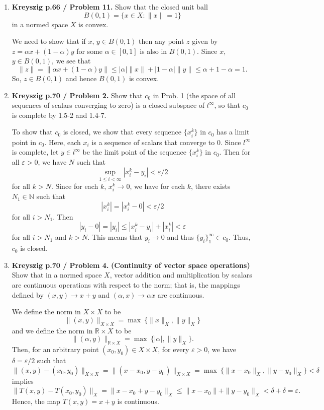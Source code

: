 \documentclass[12pt]{article}
\newcommand{\rl}{\mathbb{R}}
\begin{document}
\begin{enumerate}
\item \textbf{Kreyszig p.66 / Problem 11.}
    Show that the closed unit ball
    $$B(0,1)=\{ x\in X :\|x\|=1\}$$
    in a normed space $X$ is convex.
\begin{mybox}

    We need to show that if $x$, $y\in B(0,1)$
    then any point $z$ given by $z=\alpha x+(1-\alpha)y$
    for some $\alpha\in [0,1]$ is also
    in $B(0,1)$. Since $x$, $y\in B(0,1)$,
    we see that
    $$\|z\|=\|\alpha x+(1-\alpha)y\|\leq
    |\alpha|\|x\|+|1-\alpha|\|y\|\leq \alpha+1-\alpha=1.$$
    So, $z\in B(0,1)$ and hence $B(0,1)$ is convex.
\end{mybox}
 
\item \textbf{Kreyszig p.70 / Problem 2.}
    Show that $c_0$ in Prob. 1 (the space of all sequences
    of scalars converging to zero) is a closed
    subspace of $l^{\infty}$, so that $c_0$ is
    complete by 1.5-2 and 1.4-7.
\begin{mybox}

    To show that $c_0$ is closed, we show that
    every sequence $\{x_i^k\}$ in $c_0$ has a
    limit point in $c_0$. Here, each $x_i$ is a
    sequence of scalars that converge to 0. Since
    $l^\infty$ is complete, let $y\in l^\infty$ be
    the limit point of the sequence
    $\{x_i^k\}$ in $c_0$. Then for all $\varepsilon>0$,
    we have $N$ such that
    $$\sup_{1\leq i<\infty} |x_i^k-y_i|<\varepsilon/2$$
    for all $k>N$. Since for each $k$, $x_i^k\to 0$,
    we have for each $k$, there exists $N_1\in \mathbb{N}$
    such that 
    $$|x_i^k|=|x_i^k-0|<\varepsilon/2$$
    for all $i>N_1$. Then
    $$|y_i-0|=|y_i|\leq|x_i^k-y_i|+|x_i^k|<\varepsilon$$
    for all $i>N_1$ and $k>N$. This means that $y_i\to 0$
    and thus $\{y_i\}_1^\infty\in c_0$. Thus, $c_0$ is
    closed.
\end{mybox}
 
\item \textbf{Kreyszig p.70 / Problem 4.}
    \textbf{(Continuity of vector space operations)}
    Show that in a normed space $X$, vector addition and
    multiplication by scalars are continuous operations with
    respect to the norm; that is, the mappings defined by
    $(x,y) \to x+y$ and $(\alpha, x) \to \alpha x$ are
    continuous.
\begin{mybox}

    We define the norm in $X\times X$ to be
    $$\|(x,y)\|_{X\times X}=\max\ \{\|x\|_X,\|y\|_X\}$$
    and we define the norm in $\rl\times X$ to be
    $$\|(\alpha,y)\|_{\rl\times X}=
    \max\ \{|\alpha|,\|y\|_X\}.$$
    Then, for an arbitrary point $(x_0,y_0)\in X\times X$,
    for every $\varepsilon>0$, we have $\delta=\varepsilon
    /2$ such that
    $$\|(x,y)-(x_0,y_0)\|_{X\times X}=
    \|(x-x_0,y-y_0)\|_{X\times X}=\max\ \{\|x-x_0\|_X,
    \|y-y_0\|_X\}<\delta$$
    implies
    $$\|T(x,y)-T(x_0,y_0)\|_X=
    \|x-x_0+y-y_0\|_X\leq \|x-x_0\|+
    \|y-y_0\|_X<\delta+\delta= \varepsilon.$$
    Hence, the map $T(x,y)=x+y$ is continuous.


\end{mybox}
\end{enumerate}
\end{document}
